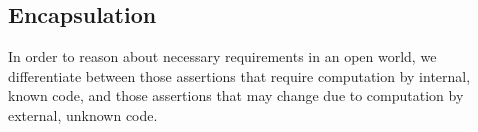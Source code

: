 %

\subsection{Encapsulation}
In order to reason about necessary requirements in an open world,
we differentiate between those assertions that require computation
by internal, known code, and those assertions that may change due 
to computation by external, unknown code.

